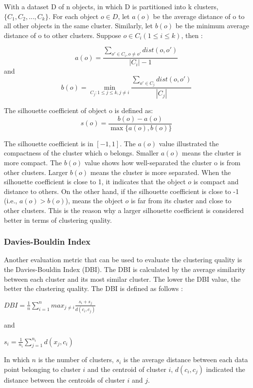 \documentclass[12pt]{article}
\begin{document}
\noindent With a dataset D of n objects, in which D is partitioned into 
k clusters, $\{C_1,C_2,...,C_k\}$. For each object $o \in D$, 
let $a(o)$ be the average distance of o to all other objects in the same cluster.
Similarly, let $b(o)$ be the minimum average distance of o to other clusters.
Suppose $o \in C_i(1 \leq i \leq k )$, then \citep{2012vi}: 

$$a(o) = \frac{\sum_{o' \in C_i , o \neq o'} dist(o,o')}{|C_i| - 1}$$
and
$$b(o) = \min_{C_j: 1 \leq j \leq k, j \neq i} \frac{\sum_{o' \in C_j} dist(o,o')}{|C_j|}$$

The silhouette coefficient of object o is defined as:
$$s(o) = \frac{b(o) - a(o)}{\max\{a(o),b(o)\}}$$

\noindent The silhouette coefficient is in $[-1,1]$. The $a(o)$ value illustrated
the compactness of the cluster which o belongs. Smaller $a(o)$ means the
cluster is more compact. The $b(o)$ value shows how well-separated the 
cluster o is from other clusters. Larger $b(o)$ means the cluster is
more separated. When the silhouette coefficient is close to 1, it indicates
that the object $o$ is compact and distance to others. On the other hand, 
if the silhouette coefficient is close to -1 (i.e., $a(o) > b(o)$), means
the object $o$ is far from its cluster and close to other clusters. This is
the reason why a larger silhouette coefficient is considered better in terms of
clustering quality. 


\subsubsection{Davies-Bouldin Index}

\noindent Another evaluation metric that can be used to evaluate
the clustering quality is the Davies-Bouldin Index (DBI). The DBI
is calculated by the average similarity between each cluster and its
most similar cluster. The lower the DBI value, the better the clustering
quality. The DBI is defined as follows \citep{HOSEN2023688}:
\begin{center}

$ DBI = \frac{1}{n} \sum_{i=1}^{n} max_{j \neq i} \frac{s_i + s_j}{d(c_i,c_j)}$

\end{center}
and
\begin{center}
$s_i = \frac{1}{n_i} \sum_{j=1}^{n_i} d(x_j,c_i)$
\end{center}
\noindent In which $n$ is the number of clusters, $s_i$ is the average distance between
each data point belonging to cluster $i$ and the centroid of cluster $i$, 
$d(c_i,c_j)$ indicated the distance between the centroids of cluster $i$ and
$j$.
\end{document}
